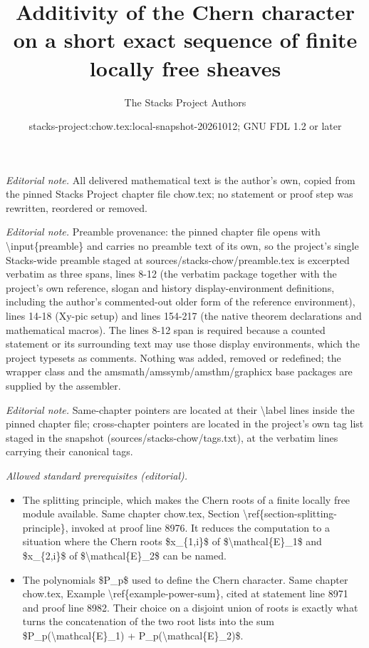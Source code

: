 \documentclass[10pt,a4paper]{amsart}
\title{Additivity of the Chern character on a short exact sequence of finite locally free sheaves}
\author{The Stacks Project Authors}
\date{stacks-project:chow.tex:local-snapshot-20261012; GNU FDL 1.2 or later}
\theoremstyle{plain}
\theoremstyle{definition}
\theoremstyle{remark}
\numberwithin{equation}{subsection}
\begin{document}
\maketitle
\noindent\textit{Editorial note.} All delivered mathematical text is the author's own, copied from the pinned Stacks Project chapter file chow.tex; no statement or proof step was rewritten, reordered or removed.\par\medskip
\noindent\textit{Editorial note.} Preamble provenance: the pinned chapter file opens with \textbackslash{}input\{preamble\} and carries no preamble text of its own, so the project's single Stacks-wide preamble staged at sources/stacks-chow/preamble.tex is excerpted verbatim as three spans, lines 8-12 (the verbatim package together with the project's own reference, slogan and history display-environment definitions, including the author's commented-out older form of the reference environment), lines 14-18 (Xy-pic setup) and lines 154-217 (the native theorem declarations and mathematical macros). The lines 8-12 span is required because a counted statement or its surrounding text may use those display environments, which the project typesets as comments. Nothing was added, removed or redefined; the wrapper class and the amsmath/amssymb/amsthm/graphicx base packages are supplied by the assembler.\par\medskip
\noindent\textit{Editorial note.} Same-chapter pointers are located at their \textbackslash{}label lines inside the pinned chapter file; cross-chapter pointers are located in the project's own tag list staged in the snapshot (sources/stacks-chow/tags.txt), at the verbatim lines carrying their canonical tags.\par\medskip
\noindent\textit{Allowed standard prerequisites (editorial).}\begin{itemize}
\item The splitting principle, which makes the Chern roots of a finite locally free module available. Same chapter chow.tex, Section \textbackslash{}ref\{section-splitting-principle\}, invoked at proof line 8976. It reduces the computation to a situation where the Chern roots \$x\_\{1,i\}\$ of \$\textbackslash{}mathcal\{E\}\_1\$ and \$x\_\{2,i\}\$ of \$\textbackslash{}mathcal\{E\}\_2\$ can be named.
\item The polynomials \$P\_p\$ used to define the Chern character. Same chapter chow.tex, Example \textbackslash{}ref\{example-power-sum\}, cited at statement line 8971 and proof line 8982. Their choice on a disjoint union of roots is exactly what turns the concatenation of the two root lists into the sum \$P\_p(\textbackslash{}mathcal\{E\}\_1) + P\_p(\textbackslash{}mathcal\{E\}\_2)\$.
\end{itemize}\medskip
\end{document}
